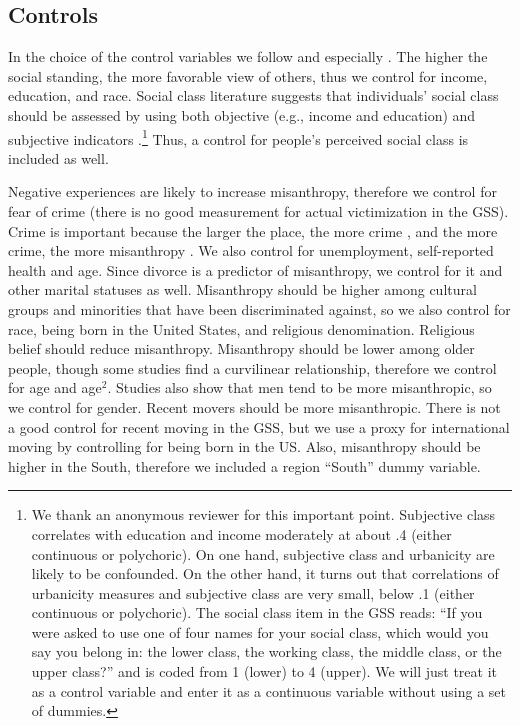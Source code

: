 \documentclass[11pt, letterpaper]{article}
\begin{document}
\begin{spacing}{1.4}
\subsection*{Controls}

In the choice of the control variables we follow \citet{welch07} and especially \citet{smith97}.
The higher the social standing, the more favorable view of others, thus we control for income, education, and race. Social class literature suggests that individuals' social class should be assessed by using both objective (e.g., income and education) and subjective indicators \citep[e.g.,][]{kraus09}.\footnote{We thank an anonymous reviewer for this important point. Subjective class correlates with education and income moderately at about .4 (either continuous or polychoric). On one hand, subjective class and urbanicity are likely to be confounded. On the other hand, it turns out that correlations of urbanicity measures and subjective class are very small, below .1 (either continuous or polychoric). The social class item in the GSS reads: ``If you were asked to use one of four names for your social class, which would you say you belong in: the lower class, the working class, the middle class, or the upper class?'' and is coded from 1 (lower) to 4 (upper). We will just treat it as a control variable and enter it as a continuous variable without using a set of dummies.} Thus, a control for people's perceived social class is included as well. 

Negative experiences are likely to increase misanthropy, therefore we control for fear of crime (there is no good measurement for actual victimization in the GSS). Crime is important because the larger the place, the more crime \citep{bettencourt10b}, and the more crime, the more misanthropy \citep{wilson85}. We also control for unemployment, self-reported health and age. Since divorce is a predictor of misanthropy, we control for it and other marital statuses as well.  Misanthropy should be higher among cultural groups and minorities that have been discriminated against, so we also control for race, being born in the United States, and religious denomination. Religious belief should reduce misanthropy. Misanthropy should be lower among older people, though some studies find a curvilinear relationship, therefore we control for age and age$^2$. Studies also show that men tend to be more misanthropic, so we control for gender. Recent movers should be more misanthropic. There is not a good control for recent moving in the GSS, but we use a proxy for international moving by controlling for being born in the US. Also, misanthropy should be higher in the South, therefore we included a region ``South'' dummy variable.


\end{spacing}
\end{document}
